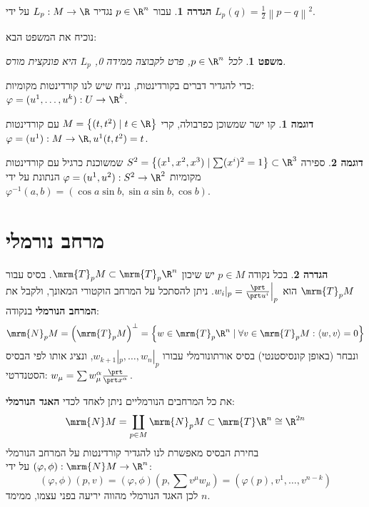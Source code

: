 \documentclass{article}
\newtheorem*{theorem*}{משפט}
\theoremstyle{definition}
\newtheorem*{definition*}{הגדרה}
\newtheorem*{example*}{דוגמה}
\newcommand{\norm}[1]{\left\lVert#1\right\rVert}
\begin{document}
	\begin{definition*}
		עבור
		\(p\in \R^n\)
		נגדיר
		\(L_p:M\to \R\)
		על ידי
		\(L_p(q)=\frac{1}{2}\norm{p-q}^2\).
	\end{definition*}

	נוכיח את המשפט הבא:
	\begin{theorem*}
		לכל
		\(p\in \R^n\),
		פרט לקבוצה ממידה 0, \(L_p\) היא פונקצית מורס.
	\end{theorem*}

	כדי להגדיר דברים בקורדינטות, נניח שיש לנו קורדינטות מקומיות:
	\(\varphi=(u^1,\dotsc,u^k): U \to \R^k\).
	
	\begin{example*}
		קו ישר שמשוכן כפרבולה, קרי
		\(M = \left\{ (t,t^2)\mid t \in \R \right\}\)
		עם קורדינטות
		\(\varphi=(u^1): M \to \R, u^1(t,t^2)=t\).
	\end{example*}
	
	\begin{example*}
		ספירה
		\(S^2 = \left\{(x^1,x^2,x^3) \mid \sum (x^i)^2 = 1 \right\} \subset \R^3 \)
		שמשוכנת כרגיל עם קורדינטות מקומיות
		\(\varphi=(u^1,u^2): S^2 \to \R^2\)
		הנתונת על ידי
		\(
			\varphi^{-1}(a, b) = \left(
				\cos a \sin b,
				\sin a \sin b,
				\cos b
			\right)
		\).
	\end{example*}




	\section{מרחב נורמלי}
	
	\begin{definition*}
		בכל נקודה
		$p\in M$
		יש שיכון
		\(\mrm{T}_p M \subset \mrm{T}_p \R^n\).
		בסיס עבור
		\(\mrm{T}_p M\)
		הוא
		\(w_i|_p=\frac{\prt}{\prt u^i}\Big|_p\).
		ניתן להסתכל על המרחב הוקטורי המאונך, ולקבל את \textbf{המרחב הנורמלי} בנקודה:
		\[
			\mrm{N}_p M
			= \left(\mrm{T}_p M\right)^\bot
			= \left\{
				w \in \mrm{T}_p \R^n
				\mid
				\forall v \in \mrm{T}_p M: \langle w,v \rangle=0
			\right\}
		\]
		ונבחר (באופן קונסיסטנטי) בסיס אורתונורמלי עבורו
		\(w_{k+1}|_p,\dotsc,w_{n}|_p\),
		ונציג אותו לפי הבסיס הסטנדרטי:
		\(w_\mu = \sum w^\alpha_\mu \frac{\prt}{\prt x^\alpha}\).
		
		את כל המרחבים הנורמליים ניתן לאחד לכדי \textbf{האגד הנורמלי}:
		\[
			\mrm{N} M
			= \coprod_{p \in M} \mrm{N}_p M
			\subset \mrm{T} \R^n
			\cong \R^{2n}
		\]
		בחירת הבסיס מאפשרת לנו להגדיר קורדינטות על המרחב הנורמלי
		\((\varphi,\phi): \mrm{N} M \to \R^n\)
		על ידי:
		\[
			(\varphi,\phi)(p,v)
			= (\varphi,\phi)(p,\sum v^\mu w_\mu)
			= (\varphi(p),v^1,\dotsc,v^{n-k})
		\]
		לכן האגד הנורמלי מהווה יריעה בפני עצמו, ממימד \(n\).
	\end{definition*}
\end{document}
